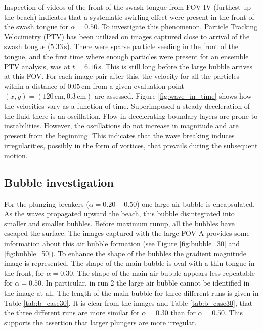 \documentclass[review, authoryear]{elsarticle}
\newcommand{\s}{\,\mbox{s}}
\newcommand{\cm}{\,\mbox{cm}}
\begin{document}
Inspection of videos of the front of the swash tongue from FOV IV (furthest up the beach) indicates that a systematic swirling effect were present in the front of the swash tongue for $\alpha=0.50$. To investigate this phenomenon, Particle Tracking Velocimetry (PTV) has been utilized on images captured close to arrival of the swash tongue ($5.33\s$). There were sparse particle seeding in the front of the tongue, and the first time where enough particles were present for an ensemble PTV analysis, was at $t=6.16\s$. This is still long before the large bubble arrives at this FOV. For each image pair after this, the velocity for all the particles within a distance of $0.05\cm$ from a given evaluation point $(x,y)=(120\cm,0.3\cm)$ are assessed. Figure \ref{fig:wave_in_time} shows how the velocities vary as a function of time. Superimposed a steady deceleration of the fluid there is an 
oscillation.
Flow in decelerating boundary layers are prone to instabilities.
However, the oscillations do not increase in magnitude and are present
from the beginning. 
   This indicates that the wave breaking induces irregularities, possibly in the form of vortices, that prevails during the subsequent motion. 


 
 \subsection{Bubble investigation}
 \label{bub_inv}
 For the plunging breakers ($\alpha=0.20-0.50$) one large air bubble is encapsulated. As the waves propagated upward the beach, this bubble disintegrated into smaller and smaller bubbles. Before maximum runup, all the 
bubbles have escaped the surface. The images captured with the large FOV A provides some information about this air bubble formation (see Figure \ref{fig:bubble_30} and \ref{fig:bubble_50}). To enhance the shape of the bubbles the gradient magnitude image is represented. The shape of the main bubble is oval with a thin tongue in the front, for $\alpha=0.30$. The shape of the main air bubble appears less repeatable for $\alpha=0.50$. In particular, in run 2 the large air bubble cannot
 be identified in the image at all. The length of the main bubble for three different runs is given in Table \ref{tab:b_case30}. It is clear from the images and Table \ref{tab:b_case30}, that the three different runs are more similar for $\alpha=0.30$ than for $\alpha=0.50$. This supports the assertion that larger plungers are more irregular.
 
\end{document}
